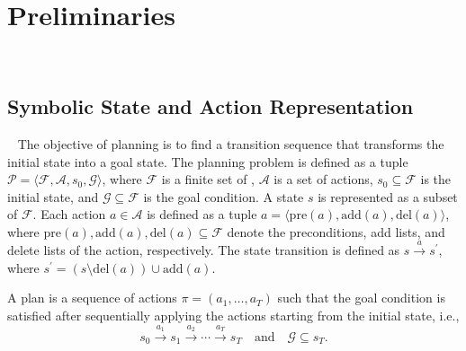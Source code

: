 \section{Preliminaries}~\label{preliminaries}
\subsection{Symbolic State and Action Representation}~\label{preliminaries:STRIPS}
The objective of planning is to find a transition sequence that transforms the initial state into a goal state. The planning problem is defined as a tuple $\mathcal{P} = \langle \mathcal{F}, \mathcal{A}, s_0, \mathcal{G} \rangle$, where $\mathcal{F}$ is a finite set of , $\mathcal{A}$ is a set of actions, $s_0 \subseteq \mathcal{F}$ is the initial state, and $\mathcal{G} \subseteq \mathcal{F}$ is the goal condition. A state $s$ is represented as a subset of $\mathcal{F}$. Each action $a \in \mathcal{A}$ is defined as a tuple $a = \langle \mathrm{pre}(a), \mathrm{add}(a), \mathrm{del}(a) \rangle$, where $\mathrm{pre}(a), \mathrm{add}(a), \mathrm{del}(a) \subseteq \mathcal{F}$ denote the preconditions, add lists, and delete lists of the action, respectively. 
The state transition is defined as $s \xrightarrow{a} s^\prime$, where $s^\prime = (s \setminus \mathrm{del}(a)) \cup \mathrm{add}(a).$

A plan is a sequence of actions $\pi = (a_1, \dots, a_T)$ such that the goal condition is satisfied after sequentially applying the actions starting from the initial state, i.e.,
\[
s_0 \xrightarrow{a_1} s_1 \xrightarrow{a_2} \cdots \xrightarrow{a_T} s_T
\quad \text{and} \quad \mathcal{G} \subseteq s_T.
\]

